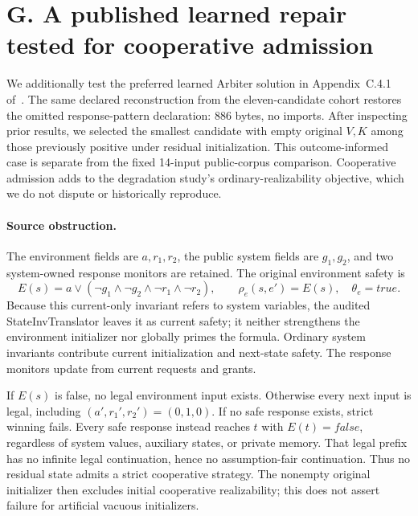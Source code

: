 \section*{G. A published learned repair tested for cooperative admission}
We additionally test the preferred learned Arbiter solution in
Appendix~C.4.1 of~\cite{degradation}.
The same declared reconstruction from the eleven-candidate cohort restores the omitted response-pattern declaration: 886 bytes, no imports. After inspecting prior results, we selected the smallest candidate with empty original $V,K$ among those previously positive under residual initialization. This outcome-informed case is separate from
the fixed 14-input public-corpus comparison. Cooperative admission adds to the degradation study's ordinary-realizability objective, which we do not dispute or historically reproduce.

\paragraph{Source obstruction.}
The environment fields are $a,r_1,r_2$, the public system fields are
$g_1,g_2$, and two system-owned response monitors are retained. The
original environment safety is
\[
 E(s)=a\lor(\neg g_1\land\neg g_2\land\neg r_1\land\neg r_2),
 \qquad \rho_e(s,e')=E(s),\quad\theta_e=\mathit{true}.
\]
Because this current-only invariant refers to system variables, the
audited StateInvTranslator leaves it as current safety; it neither
strengthens the environment initializer nor globally primes the formula.
Ordinary system invariants contribute current initialization and next-state
safety. The response monitors update from current requests and grants.

If $E(s)$ is false, no legal environment input exists. Otherwise every
next input is legal, including $(a',r_1',r_2')=(0,1,0)$. If no safe
response exists, strict winning fails. Every safe response instead reaches
$t$ with $E(t)=\mathit{false}$, regardless of system values, auxiliary
states, or private memory. That legal prefix has no infinite legal
continuation, hence no assumption-fair continuation. Thus no residual
state admits a strict cooperative strategy. The nonempty original
initializer then excludes initial cooperative realizability; this does
not assert failure for artificial vacuous initializers.


